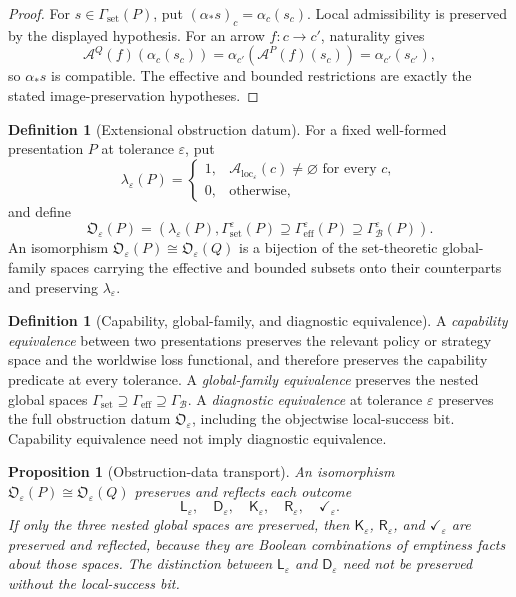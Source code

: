 \documentclass[11pt]{article}
\theoremstyle{plain}
\newtheorem{proposition}[theorem]{Proposition}
\theoremstyle{definition}
\newtheorem{definition}[theorem]{Definition}
\theoremstyle{remark}
\newcommand{\LocalAdm}{\mathcal{A}_{\mathrm{loc}}}
\newcommand{\eps}{\varepsilon}
\begin{document}
\begin{proof}
For $s\in\Gamma_{\mathrm{set}}(P)$, put
$(\alpha_*s)_c=\alpha_c(s_c)$. Local admissibility is preserved by the displayed
hypothesis. For an arrow $f:c\to c'$, naturality gives
\[
\mathcal A^Q(f)(\alpha_c(s_c))
=\alpha_{c'}(\mathcal A^P(f)(s_c))
=\alpha_{c'}(s_{c'}),
\]
so $\alpha_*s$ is compatible. The effective and bounded restrictions are exactly
the stated image-preservation hypotheses.
\end{proof}

\begin{definition}[Extensional obstruction datum]
\label{def:obstruction-datum}
For a fixed well-formed presentation $P$ at tolerance $\eps$, put
\[
\lambda_\eps(P)=
\begin{cases}
1,&\LocalAdm_\eps(c)\ne\varnothing\text{ for every }c,\\
0,&\text{otherwise},
\end{cases}
\]
and define
\[
\mathfrak O_\eps(P)=
\left(
\lambda_\eps(P),
\Gamma_{\mathrm{set}}^\eps(P)
\supseteq\Gamma_{\mathrm{eff}}^\eps(P)
\supseteq\Gamma_{\mathcal B}^\eps(P)
\right).
\]
An isomorphism $\mathfrak O_\eps(P)\cong\mathfrak O_\eps(Q)$ is a bijection of
the set-theoretic global-family spaces carrying the effective and bounded
subsets onto their counterparts and preserving $\lambda_\eps$.
\end{definition}

\begin{definition}[Capability, global-family, and diagnostic equivalence]
\label{def:equivalence-levels}
A \emph{capability equivalence} between two presentations preserves the relevant
policy or strategy space and the worldwise loss functional, and therefore
preserves the capability predicate at every tolerance. A \emph{global-family
equivalence} preserves the nested global spaces
$\Gamma_{\mathrm{set}}\supseteq\Gamma_{\mathrm{eff}}\supseteq
\Gamma_{\mathcal B}$. A \emph{diagnostic equivalence} at tolerance $\eps$
preserves the full obstruction datum $\mathfrak O_\eps$, including the
objectwise local-success bit. Capability equivalence need not imply diagnostic
equivalence.
\end{definition}

\begin{proposition}[Obstruction-data transport]
\label{prop:obstruction-transport}
An isomorphism $\mathfrak O_\eps(P)\cong\mathfrak O_\eps(Q)$ preserves and
reflects each outcome
\[
\mathsf L_\eps,\quad\mathsf D_\eps,\quad
\mathsf K_\eps,\quad\mathsf R_\eps,\quad\checkmark_\eps.
\]
If only the three nested global spaces are preserved, then
$\mathsf K_\eps$, $\mathsf R_\eps$, and $\checkmark_\eps$ are preserved and
reflected, because they are Boolean combinations of emptiness facts about those
spaces. The distinction between $\mathsf L_\eps$ and $\mathsf D_\eps$ need not
be preserved without the local-success bit.
\end{proposition}
\end{document}
